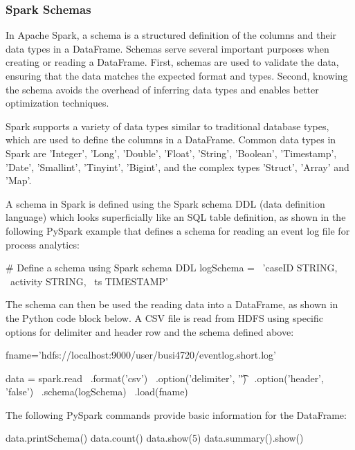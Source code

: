 \begin{withcode}
\subsubsection*{Spark Schemas}

In Apache Spark, a schema is a structured definition of the columns and their data types in a DataFrame. Schemas serve several important purposes when creating or reading a DataFrame. First, schemas are used to validate the data, ensuring that the data matches the expected format and types. Second, knowing the schema avoids the overhead of inferring data types and enables better optimization techniques. 

Spark supports a variety of data types similar to traditional database types, which are used to define the columns in a DataFrame. Common data types in Spark are 'Integer', 'Long', 'Double', 'Float', 'String', 'Boolean', 'Timestamp', 'Date', 'Smallint', 'Tinyint', 'Bigint', and the complex types 'Struct', 'Array' and 'Map'.

A schema in Spark is defined using the Spark schema DDL (data definition language) which looks superficially like an SQL table definition, as shown in the following PySpark example that defines a schema for reading an event log file for process analytics:

\begin{pythoncode}
# Define a schema using Spark schema DDL
logSchema = \
    'caseID STRING, \
     activity STRING, \
     ts TIMESTAMP'
\end{pythoncode}

The schema can then be used the reading data into a DataFrame, as shown in the Python code block below. A CSV file is read from HDFS using specific options for delimiter and header row and the schema defined above:

\begin{pythoncode}
fname='hdfs://localhost:9000/user/busi4720/eventlog.short.log'

data = spark.read \
    .format('csv') \
    .option('delimiter', '\t') \
    .option('header', 'false') \
    .schema(logSchema) \
    .load(fname)
\end{pythoncode}

The following PySpark commands provide basic information for the DataFrame:

\begin{pythoncode}
data.printSchema()
data.count()
data.show(5)
data.summary().show()
\end{pythoncode}
\end{withcode}

